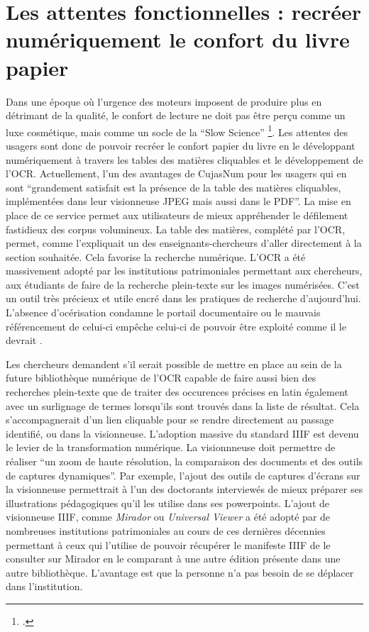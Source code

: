 \section[Les attentes fonctionnelles]{Les attentes fonctionnelles : recréer numériquement le confort du livre papier}
Dans une époque où l'urgence des moteurs imposent de produire plus en détrimant de la qualité, le confort de lecture ne doit pas être perçu comme un luxe cosmétique, mais comme un socle de la \enquote{Slow Science} \footcite{fournier-sowinskiSlowScienceRepenser}. Les attentes des usagers sont donc de pouvoir recréer le confort papier du livre en le développant numériquement à travers les tables des matières cliquables et le développement de l'\ac{OCR}. Actuellement, l'un des avantages de CujasNum pour les usagers qui en sont \enquote{grandement satisfait est la présence de la table des matières cliquables, implémentées dans leur visionneuse \ac{JPEG} mais aussi dans le \ac{PDF}}. La mise en place de ce service permet aux utilisateurs de mieux appréhender le défilement fastidieux des corpus volumineux. La table des matières, complété par l'\ac{OCR}, permet, comme l'expliquait un des enseignants-chercheurs d'aller directement à la section souhaitée. Cela favorise la recherche numérique. L'\ac{OCR} a été massivement adopté par les institutions patrimoniales permettant aux chercheurs, aux étudiants de faire de la recherche plein-texte sur les images numérisées. C'est un outil très précieux et utile encré dans les pratiques de recherche d'aujourd'hui. L'absence d'océrisation condamne le portail documentaire ou le mauvais référencement de celui-ci empêche celui-ci de pouvoir être exploité comme il le devrait . 

Les chercheurs demandent s'il serait possible de mettre en place au sein de la future bibliothèque numérique de l'\ac{OCR} capable de faire aussi bien des recherches plein-texte que de traiter des occurences précises en latin également avec un surlignage de termes lorsqu'ils sont trouvés dans la liste de résultat. Cela s'accompagnerait d'un lien cliquable pour se rendre directement au passage identifié, ou dans la visionneuse. L'adoption massive du standard \ac{IIIF} est devenu le levier de la transformation numérique. La visionnneuse doit permettre de réaliser \enquote{un zoom de haute résolution, la comparaison des documents et des outils de captures dynamiques}. Par exemple, l'ajout des outils de captures d'écrans sur la visionneuse permettrait à l'un des doctorants interviewés de mieux préparer ses illustrations pédagogiques qu'il les utilise dans ses powerpoints. L'ajout de visionneuse \ac{IIIF}, comme \textit{Mirador} ou \textit{Universal Viewer} a été adopté par de nombreuses institutions patrimoniales au cours de ces dernières décennies permettant à ceux qui l'utilise de pouvoir récupérer le manifeste \ac{IIIF} de le consulter sur Mirador en le comparant à une autre édition présente dans une autre bibliothèque. L'avantage est que la personne n'a pas besoin de se déplacer dans l'institution. 

